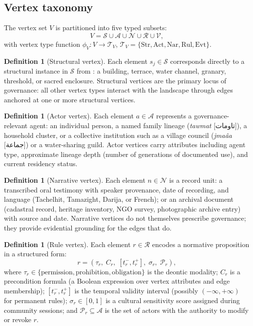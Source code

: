 \documentclass[11pt,a4paper]{article}
\theoremstyle{plain}
\theoremstyle{definition}
\newtheorem{definition}[theorem]{Definition}
\theoremstyle{remark}
\newcommand{\Struc}{\mathcal{S}}
\newcommand{\Act}{\mathcal{A}}
\newcommand{\Nar}{\mathcal{N}}
\newcommand{\Rul}{\mathcal{R}}
\newcommand{\Evt}{\mathcal{V}}
\newcommand{\Tv}{\mathcal{T}_V}
\newcommand{\textarabic}[1]{{\arabicfont #1}}
\begin{document}
\subsection{Vertex taxonomy}
\label{sec:layer2_vertices}

The vertex set $V$ is partitioned into five typed subsets:
\[
  V = \Struc \cup \Act \cup \Nar \cup \Rul \cup \Evt,
\]
with vertex type function $\phi_V : V \to \Tv$,
$\Tv = \{\mathrm{Str}, \mathrm{Act}, \mathrm{Nar}, \mathrm{Rul},
\mathrm{Evt}\}$.

\begin{definition}[Structural vertex]
Each element $s_j \in \Struc$ corresponds directly to a structural
instance in $\Struc$ from : a building,
terrace, water channel, granary, threshold, or sacred enclosure.
Structural vertices are the primary locus of governance: all other
vertex types interact with the landscape through edges anchored at one
or more structural vertices.
\end{definition}

\begin{definition}[Actor vertex]
Each element $a \in \Act$ represents a governance-relevant agent: an
individual person, a named family lineage
(\textit{tawmat} [\textarabic{تاومات}]), a
household cluster, or a collective institution such as a village council
(\textit{jma\^{a}a} [\textarabic{جماعة}]) or a water-sharing guild. Actor vertices carry
attributes including agent type, approximate lineage depth (number of
generations of documented use), and current residency status.
\end{definition}

\begin{definition}[Narrative vertex]
Each element $n \in \Nar$ is a record unit: a transcribed oral
testimony with speaker provenance, date of recording, and language
(Tachelhit, Tamazight, Darija, or French); or an archival document
(cadastral record, heritage inventory, NGO survey, photographic archive
entry) with source and date. Narrative vertices do not themselves
prescribe governance; they provide evidential grounding for the edges
that do.
\end{definition}

\begin{definition}[Rule vertex]
\label{def:rule_vertex}
Each element $r \in \Rul$ encodes a normative proposition in a
structured form:
\[
  r = (\tau_r,\; C_r,\; [t_r^-, t_r^+],\; \sigma_r,\; \mathcal{P}_r),
\]
where $\tau_r \in \{\mathrm{permission}, \mathrm{prohibition},
\mathrm{obligation}\}$ is the deontic modality; $C_r$ is a
precondition formula (a Boolean expression over vertex attributes and
edge membership); $[t_r^-, t_r^+]$ is the temporal validity interval
(possibly $(-\infty, +\infty)$ for permanent rules); $\sigma_r \in
[0,1]$ is a cultural sensitivity score assigned during community
sessions; and $\mathcal{P}_r \subseteq \Act$ is the set of actors with
the authority to modify or revoke $r$.
\end{definition}
\end{document}
